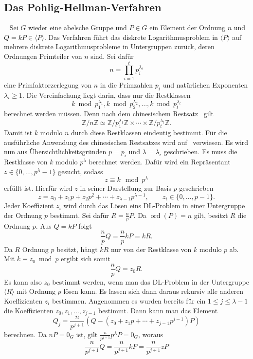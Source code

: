 \subsection{Das Pohlig-Hellman-Verfahren}~\label{pohlig-hellman}
Sei $G$ wieder eine abelsche Gruppe und $P\in G$ ein Element der Ordnung $n$ und $Q = kP\in \langle P \rangle$. Das Verfahren führt das diskrete Logarithmusproblem in \(\langle P\rangle\) auf mehrere diskrete Logarithmusprobleme in Untergruppen zurück, deren Ordnungen Primteiler von \(n\) sind. Sei dafür
\[
    n = \prod_{i=1}^t p_i^{\lambda_i}
\]
eine Primfaktorzerlegung von $n$ in die Primzahlen $p_i$ und natürlichen Exponenten $\lambda_i\geq 1$. Die Vereinfachung liegt darin, dass nur die Restklassen
\[
    k\bmod p_1^{\lambda_1},k\bmod p_2^{\lambda_2},\dots,k\bmod p_t^{\lambda_t}
\]
berechnet werden müssen. Denn nach dem chinesischem Restsatz~\cite[~S.90, Satz 6.8]{karpf24} gilt
\[
    \mathbb{Z}/n\mathbb{Z}
    \simeq
    \mathbb{Z}/p_1^{\lambda_1}\mathbb{Z}
    \times\cdots\times
    \mathbb{Z}/p_t^{\lambda_t}\mathbb{Z}.
\]
Damit ist \(k\) modulo \(n\) durch diese Restklassen eindeutig bestimmt. Für die ausführliche Anwendung des chinesischen Restsatzes wird auf~\cite[~S.114-116]{werner02} verwiesen. Es wird nun aus Übersichtlichkeitsgründen $p=p_i$ und $\lambda=\lambda_i$ geschrieben. Es muss die Restklasse von $k$ modulo $p^\lambda$ berechnet werden. Dafür wird ein Repräsentant \(z\in\{0,\dots,p^\lambda-1\}\) gesucht, sodass
\[
    z\equiv k\mod p^\lambda
\]
erfüllt ist. Hierfür wird $z$ in seiner Darstellung zur Basis $p$ geschrieben
\[
    z = z_0+z_1p+z_2p^2+\cdots+z_{\lambda-1}p^{\lambda-1}, \qquad z_i\in\{0,\dots,p-1\}.
\]
Jeder Koeffizient $z_i$ wird durch das Lösen eins DL-Problem in einer Untergruppe der Ordnung $p$ bestimmt. Sei dafür $R=\frac{n}{p}P$. Da $\operatorname{ord}(P)=n$ gilt, besitzt $R$ die Ordnung $p$. Aus $Q=kP$ folgt
\[
    \frac{n}{p}Q=\frac{n}{p}kP=kR.
\]
Da $R$ Ordnung $p$ besitzt, hängt $kR$ nur von der Restklasse von $k$ modulo $p$ ab. Mit $k\equiv z_0\bmod p$ ergibt sich somit
\[
    \frac{n}{p}Q=z_0R.
\]
Es kann also $z_0$ bestimmt werden, wenn man das DL-Problem in der Untergruppe \(\langle R\rangle\) mit Ordnung $p$ lösen kann. Es lassen sich dann daraus rekursiv alle anderen Koeffizienten $z_i$ bestimmen. Angenommen es wurden bereits für ein $1\leq j\leq \lambda-1$ die Koeffizienten $z_0,z_1,\dots,z_{j-1}$ bestimmt. Dann kann man das Element
\[
    Q_j=\frac{n}{p^{j+1}}(Q-(z_0+z_1p+\cdots+z_{j-1}p^{j-1})P)
\]
berechnen. Da $nP=0_G$ ist, gilt \(\frac{n}{p^{j+1}}p^\lambda P=0_G\), woraus
\[
    \frac{n}{p^{j+1}}Q=\frac{n}{p^{j+1}}kP=\frac{n}{p^{j+1}}zP
\]
